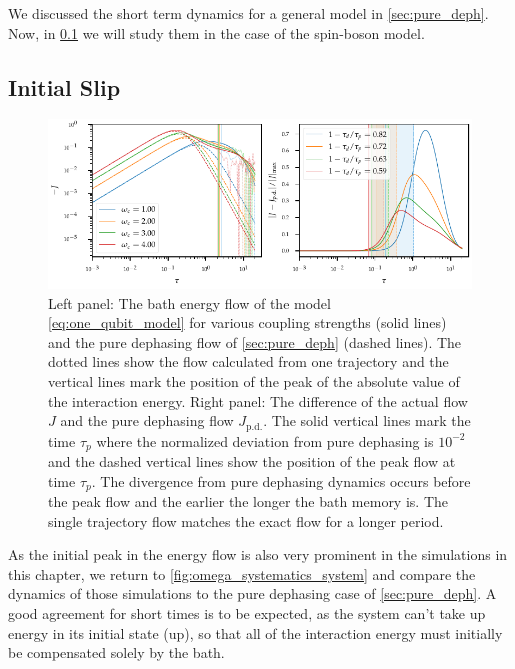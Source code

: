 We discussed the short term dynamics for a general model in
\cref{sec:pure_deph}.  Now, in \cref{sec:initial-slip-sb} we will
study them in the case of the spin-boson model.


\subsection{Initial Slip}%
\label{sec:initial-slip-sb}
\begin{figure}[htp]
  \centering
  \includegraphics{figs/one_bath_syst/omega_initial_slip}
  \caption{\label{fig:omega_initial_slip} Left panel: The bath energy
    flow of the model \cref{eq:one_qubit_model} for various coupling
    strengths (solid lines) and the pure dephasing flow of
    \cref{sec:pure_deph} (dashed lines). The dotted lines show the
    flow calculated from one trajectory and the vertical lines mark
    the position of the peak of the absolute value of the interaction
    energy. Right panel: The difference of the actual flow \(J\) and
    the pure dephasing flow \(J_\mathrm{p.d.}\). The solid vertical
    lines mark the time \(τ_p\) where the normalized deviation from
    pure dephasing is \(10^{-2}\) and the dashed vertical lines show
    the position of the peak flow at time \(τ_p\). The divergence from
    pure dephasing dynamics occurs before the peak flow and the
    earlier the longer the bath memory is. The single trajectory flow
    matches the exact flow for a longer period.}
\end{figure}

As the initial peak in the energy flow is also very prominent in the
simulations in this chapter, we return to
\cref{fig:omega_systematics_system} and compare the dynamics of those
simulations to the pure dephasing case of \cref{sec:pure_deph}. A good
agreement for short times is to be expected, as the system can't take
up energy in its initial state (up), so that all of the interaction
energy must initially be compensated solely by the bath.

